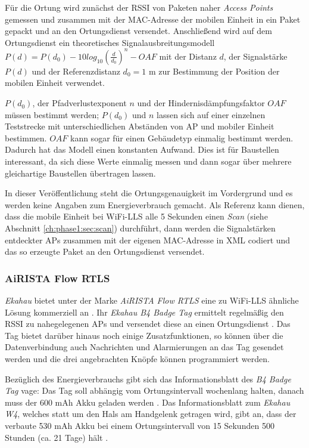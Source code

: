 Für die Ortung wird zunächst der RSSI von Paketen naher \emph{Access Points} gemessen und zusammen mit der MAC-Adresse der mobilen Einheit in ein Paket gepackt und an den Ortungsdienst versendet.
Anschließend wird auf dem Ortungsdienst ein theoretisches Signalausbreitungsmodell $P(d) = P(d_0) - 10log_{10}(\frac{d}{d_0})^n - OAF$ mit der Distanz $d$, der Signalstärke $P(d)$ und der Referenzdistanz $d_0 = 1$ m zur Bestimmung der Position der mobilen Einheit verwendet. 

$P(d_0)$, der Pfadverlustexponent $n$ und der Hindernisdämpfungsfaktor $OAF$ müssen bestimmt werden; $P(d_0)$ und $n$ lassen sich auf einer einzelnen Teststrecke mit unterschiedlichen Abständen von AP und mobiler Einheit bestimmen. $OAF$ kann sogar für einen Gebäudetyp einmalig bestimmt werden.
Dadurch hat das Modell einen konstanten Aufwand. 
Dies ist für Baustellen interessant, da sich diese Werte einmalig messen und dann sogar über mehrere gleichartige Baustellen übertragen lassen.

In dieser Veröffentlichung steht die Ortungsgenauigkeit im Vordergrund und es werden keine Angaben zum Energieverbrauch gemacht. 
Als Referenz kann dienen, dass die mobile Einheit bei WiFi-LLS alle 5 Sekunden einen \emph{Scan} (siehe Abschnitt \ref{ch:phase1:sec:scan}) durchführt, dann werden die Signalstärken entdeckter APs zusammen mit der eigenen MAC-Adresse in XML codiert und das so erzeugte Paket an den Ortungsdienst versendet.

\subsubsection{AiRISTA Flow RTLS}
\emph{Ekahau} bietet unter der Marke \textit{AiRISTA Flow RTLS} eine zu WiFi-LLS ähnliche Lösung kommerziell an \cite{airista2017airista}.
Ihr \emph{Ekahau B4 Badge Tag} ermittelt regelmäßig den RSSI zu nahegelegenen APs und versendet diese an einen Ortungsdienst \cite{liu2007survey}.
Das Tag bietet darüber hinaus noch einige Zusatzfunktionen, so können über die Datenverbindung auch Nachrichten und Alarmierungen an das Tag gesendet werden und die drei angebrachten Knöpfe können programmiert werden.

Bezüglich des Energieverbrauchs gibt sich das Informationsblatt des \emph{B4 Badge Tag} vage: Das Tag soll abhängig vom Ortungsintervall wochenlang halten, danach muss der 600 mAh Akku geladen werden \cite{ekahau2017b4}.
Das Informationsblatt zum \emph{Ekahau W4}, welches statt um den Hals am Handgelenk getragen wird, gibt an, dass der verbaute 530 mAh Akku bei einem Ortungsintervall von 15 Sekunden 500 Stunden (ca. 21 Tage) hält \cite{ekahau2017w4}.

